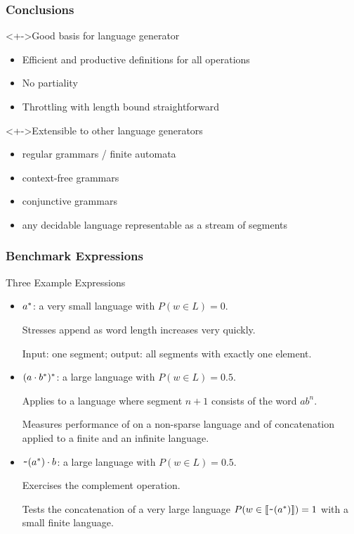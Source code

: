\documentclass[pdftex,aspectratio=169]{beamer}
\begin{document}
\begin{frame}
\begin{columns}
\begin{column}{0.69\textwidth}
\begin{center}
  \end{center}
\end{column}
  \end{columns}
\end{frame}
\begin{frame}
  \frametitle{Conclusions}
  \vspace{-\baselineskip}
  \begin{block}<+->{Good basis for language generator}
    \begin{itemize}
    \item Efficient and productive definitions for all operations
    \item No partiality
    \item Throttling with length bound straightforward
    \end{itemize}
  \end{block}
  \begin{block}<+->{Extensible to other language generators}
    \begin{itemize}
    \item regular grammars / finite automata
    \item context-free grammars
    \item conjunctive grammars
    \item any decidable language representable as a stream of segments 
    \end{itemize}
  \end{block}
\end{frame}
\begin{frame}
  \frametitle{Benchmark Expressions}
  \vspace{-\baselineskip}
  \begin{block}{Three Example Expressions}
    \begin{itemize}
    \item $a^*$: a very small language with $P (w\in L) = 0$.
    
      Stresses append as word length increases very quickly.
    
      Input: one segment; output: all segments with exactly one element. 
    \item $(a \cdot{b^*})^*$: a large language
      with $P (w\in L)=0.5$.

      Applies  to a language where segment $n+1$ consists of the word $ab^n$.

      Measures performance of  on a non-sparse
      language and of {concatenation} applied to a finite and an infinite
      language.
    \item $\texttt{\textasciitilde}{(a^*)} \cdot{b}$: a large language with
      $P (w\in L) = 0.5$.
    
      Exercises the complement operation.

      Tests the concatenation of a very large language
      $P (w\in \llbracket\texttt{\textasciitilde}{(a^*)}\rrbracket) = 1$ with a small
      finite language.
    \end{itemize}
  \end{block}
\end{frame}
\end{document}
